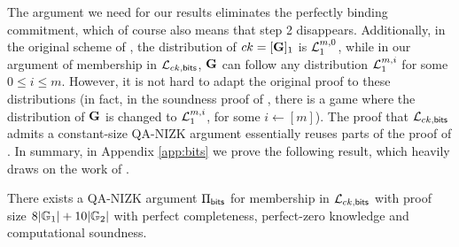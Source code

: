 The argument we need for our results eliminates the perfectly binding commitment, which of course also means that step 2 disappears. Additionally, in the original scheme of \cite{AC:GonHevRaf15}, the distribution of $ck=[\mathbf{{G}}]_1$ is $\mathcal{L}_1^{m,0}$, while in our argument of membership in 
$\mathcal{L}_{ck,\mathsf{bits}}$, $\mathbf{{G}}$ can follow any distribution $\mathcal{L}_1^{m,i}$ for some $0 \leq i \leq m$. 
However, it is not hard to adapt the original proof to these distributions (in fact, in the soundness proof of 
\cite{AC:GonHevRaf15}, there is a game where the distribution of $\mathbf{{G}}$ is changed to $\mathcal{L}_1^{m,i}$, for some $i \gets [m]$). The proof that $\mathcal{L}_{ck,\mathsf{bits}}$ admits a constant-size QA-NIZK argument essentially reuses parts of the proof of \cite{AC:GonHevRaf15}.  In summary, in 
Appendix \ref{app:bits} we prove the following result, which heavily draws on the work of \cite{AC:GonHevRaf15}. 

\begin{theorem} \label{theo:bits} There exists a QA-NIZK argument $\Pi_{\mathsf{bits}}$ for membership in $\mathcal{L}_{ck,\mathsf{bits}}$ with proof size  
$8|\mathbb{G}_1|+10|\mathbb{G}_2|$ with perfect completeness, perfect-zero knowledge and computational soundness. 
\end{theorem}


